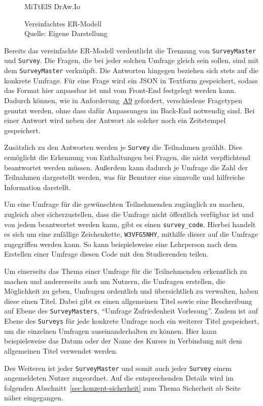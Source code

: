 \begin{figure}[ht]
	\centering
	\def\svgscale{0.72}
	\graphicspath{{img/backend/database/}}
	\scriptsize{}
	\captionsetup{format=plain, justification=centering}
	\caption[Vereinfachtes \acs{ER-Modell}]{Vereinfachtes \acs{ER-Modell}\\Quelle: Eigene Darstellung} MiTtElS DrAw.Io
	\label{fig:er-model-simplified}
\end{figure}

Bereits das vereinfachte \acs{ER-Modell} verdeutlicht die Trennung von \texttt{SurveyMaster} und \texttt{Survey}.
Die Fragen, die bei jeder solchen Umfrage gleich sein sollen, sind mit dem \texttt{SurveyMaster} verknüpft.
Die Antworten hingegen beziehen sich stets auf die konkrete Umfrage.
Für eine Frage wird ein \acs{JSON} in Textform gespeichert, sodass das Format hier anpassbar ist und vom Front-End festgelegt werden kann.
Dadurch können, wie in Anforderung~\hyperref[Anf:A9]{A9} gefordert, verschiedene Fragetypen genutzt werden, ohne dass dafür Anpassungen im Back-End notwendig sind.
Bei einer Antwort wird neben der Antwort als solcher noch ein Zeitstempel gespeichert.

Zusätzlich zu den Antworten werden je \texttt{Survey} die Teilnahmen gezählt.
Dies ermöglicht die Erkennung von Enthaltungen bei Fragen, die nicht verpflichtend beantwortet werden müssen.
Außerdem kann dadurch je Umfrage die Zahl der Teilnahmen dargestellt werden, was für Benutzer eine sinnvolle und hilfreiche Information darstellt.

Um eine Umfrage für die gewünschten Teilnehmenden zugänglich zu machen, zugleich aber sicherzustellen, dass die Umfrage nicht öffentlich verfügbar ist und von jedem beantwortet werden kann, gibt es einen \texttt{survey\_code}.
Hierbei handelt es sich um eine zufällige Zeichenkette, \zb \texttt{W3VFG5NHY}, mithilfe dieser auf die Umfrage zugegriffen werden kann.
So kann beispielsweise eine Lehrperson nach dem Erstellen einer Umfrage diesen Code mit den Studierenden teilen.

Um einerseits das Thema einer Umfrage für die Teilnehmenden erkenntlich zu machen und andererseits auch um Nutzern, die Umfragen erstellen, die Möglichkeit zu geben, Umfragen ordentlich und übersichtlich zu verwalten, haben diese einen Titel.
Dabei gibt es einen allgemeinen Titel sowie eine Beschreibung auf Ebene des \texttt{SurveyMasters}, \zb \enquote{Umfrage Zufriedenheit Vorlesung}.
Zudem ist auf Ebene des \texttt{Surveys} für jede konkrete Umfrage noch ein weiterer Titel gespeichert, um die einzelnen Umfragen auseinanderhalten zu können.
Hier kann beispielsweise das Datum oder der Name des Kurses in Verbindung mit dem allgemeinen Titel verwendet werden.

Des Weiteren ist jeder \texttt{SurveyMaster} und somit auch jeder \texttt{Survey} einem angemeldeten Nutzer zugeordnet.
Auf die entsprechenden Details wird im folgenden Abschnitt~\ref{sec:konzept-sicherheit} zum Thema Sicherheit ab Seite~\pageref{sec:authentifizierung} näher eingegangen.

